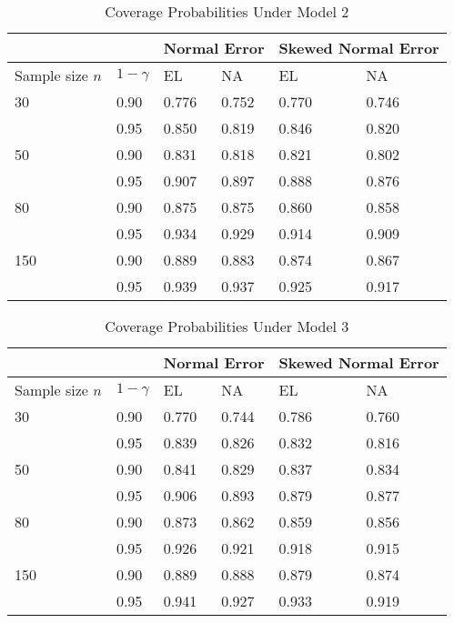 \documentclass[preprint,12pt]{elsarticle}
\begin{document}
	\begin{table}
			\caption{Coverage Probabilities Under Model 2}
	\begin{tabular}{ |p{2.5cm}|p{2cm}|p{2cm}|p{2cm}|p{2cm}|p{2cm}| }
	
		\hline
		\multicolumn{2}{|c|}{ }&\multicolumn{2}{|c|}{Normal Error}&\multicolumn{2}{|c|}{Skewed Normal Error} \\
		\hline
		Sample size $n$    & $1-\gamma$ &EL&NA  &EL&NA\\ 
		\hline
		30   & 0.90  &0.776&  0.752 &0.770 &0.746\\
		     & 0.95  & 0.850   &0.819&0.846 &0.820\\
		 \hline
		50   & 0.90 & 0.831&  0.818&0.821 &0.802\\
		     & 0.95 &0.907& 0.897&0.888 &0.876\\
		     \hline
		80   & 0.90  &0.875&0.875&0.860 &0.858\\
		     & 0.95  &0.934   &0.929&0.914 &0.909\\
		\hline
		150  & 0.90  & 0.889&0.883&0.874 &0.867\\
		     &0.95 &0.939 &0.937 &0.925 &0.917\\
		\hline
	\end{tabular}

	\end{table}
	
	
		\begin{table}
			\caption{Coverage Probabilities Under Model 3}
			\begin{tabular}{ |p{2.5cm}|p{2cm}|p{2cm}|p{2cm}|p{2cm}|p{2cm}| }
				
				\hline
				\multicolumn{2}{|c|}{ }&\multicolumn{2}{|c|}{Normal Error}&\multicolumn{2}{|c|}{Skewed Normal Error} \\
				\hline
				Sample size $n$    & $1-\gamma$ &EL&NA  &EL&NA\\ 
				\hline
				30   &  0.90    &0.770 &0.744   &0.786 &0.760\\
			    	 &  0.95    &0.839 &0.826   &0.832 &0.816\\
				\hline
				50 &0.90 &0.841 &0.829   &0.837 &0.834\\
				   &0.95 &0.906 &0.893       &0.879 &0.877\\
				\hline
				80  & 0.90  &0.873 &0.862   &0.859 &0.856\\
			    	& 0.95  &0.926 &0.921  &0.918 &0.915\\
				\hline
				150 & 0.90  &0.889 &0.888   &0.879 &0.874\\
			    	& 0.95  &0.941 &0.927  &0.933 &0.919 \\
				\hline
			\end{tabular}
			
		\end{table}
\end{document}
